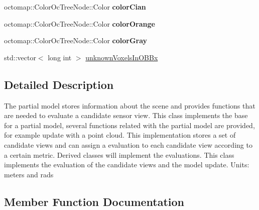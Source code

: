\begin{DoxyCompactItemize}
\item 
octomap\+::\+Color\+Oc\+Tree\+Node\+::\+Color {\bfseries color\+Cian}\hypertarget{classPartialModelBase_aac246df24988f086ac4487776909d9dc}{}\label{classPartialModelBase_aac246df24988f086ac4487776909d9dc}

\item 
octomap\+::\+Color\+Oc\+Tree\+Node\+::\+Color {\bfseries color\+Orange}\hypertarget{classPartialModelBase_a375a51e6ba3936efdadefbfc4b3b32b6}{}\label{classPartialModelBase_a375a51e6ba3936efdadefbfc4b3b32b6}

\item 
octomap\+::\+Color\+Oc\+Tree\+Node\+::\+Color {\bfseries color\+Gray}\hypertarget{classPartialModelBase_adbc17e437fd8bf007bdc919fd84e062a}{}\label{classPartialModelBase_adbc17e437fd8bf007bdc919fd84e062a}

\item 
std\+::vector$<$ long int $>$ \hyperlink{classPartialModelBase_aca8f3d799a7a13add83d4d71c218aaf6}{unknown\+Voxels\+In\+O\+B\+Bx}
\end{DoxyCompactItemize}


\subsection{Detailed Description}
The partial model stores information about the scene and provides functions that are needed to evaluate a candidate sensor view. This class implements the base for a partial model, several functions related with the partial model are provided, for example update with a point cloud. This implementation stores a set of candidate views and can assign a evaluation to each candidate view according to a certain metric. Derived classes will implement the evaluations. This class implements the evaluation of the candidate views and the model update. Units\+: meters and rads 

\subsection{Member Function Documentation}
